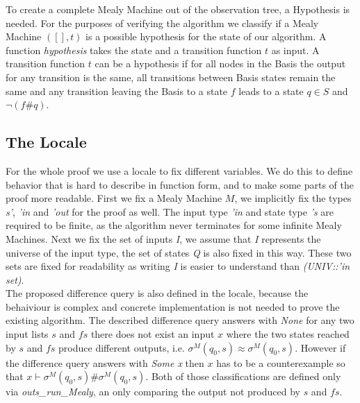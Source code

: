 To create a complete Mealy Machine out of the observation tree, a Hypothesis is needed. For the purposes of verifying the algorithm we classify if a Mealy Machine $([],t)$ is a possible hypothesis for the state of our algorithm. A function \textit{hypothesis} takes the state and a transition function $t$ as input. A transition function $t$ can be a hypothesis if for all nodes in the Basis the output for any transition is the same, all transitions between Basis states remain the same and any transition leaving the Basis to a state $f$ leads to a state $q\in S$ and $\neg (f\#q)$.
\begin{myisabelle}
	\hypothesis
\end{myisabelle}
\subsection{The Locale}
For the whole proof we use a locale to fix different variables. We do this to define behavior that is hard to describe in function form, and to make some parts of the proof more readable. First we fix a Mealy Machine $M$, we implicitly fix the types \textit{s'}, \textit{'in} and \textit{'out} for the proof as well. The input type \textit{'in} and state type \textit{'s} are required to be finite, as the algorithm never terminates for some infinite Mealy Machines. Next we fix the set of inputs \textit{I}, we assume that \textit{I} represents the universe of the input type, the set of states \textit{Q} is also fixed in this way. These two sets are fixed for readability as writing \textit{I} is easier to understand than \textit{(UNIV::'in set)}. \\
The proposed difference query is also defined in the locale, because the behaiviour is complex and concrete implementation is not needed to prove the existing algorithm. The described difference query answers with \textit{None} for any two input lists $s$ and $fs$ there does not exist an input $x$ where the two states reached by $s$ and $fs$ produce different outputs, i.e. $\sigma^M(q_0,s)\approx\sigma^M(q_0,s)$. However if the difference query answers with \textit{Some x} then $x$ has to be a counterexample so that $x\vdash\sigma^M(q_0,s)\#\sigma^M(q_0,s) $. Both of those classifications are defined only via \textit{outs\_run\_Mealy}, an only comparing the output not produced by $s$ and $fs$.
\begin{myisabelle}
	\localedef
\end{myisabelle}
